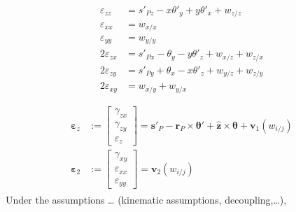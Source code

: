 \documentclass[letterpaper,10pt,english]{jupyterBook}
\begin{document}
\begin{equation*}
\begin{split}\begin{aligned}
    \varepsilon_{zz} & = s'_{Pz} - x \theta'_{y} + y \theta'_{x} + w_{z/z} \\
    \varepsilon_{xx} & = w_{x/x} \\
    \varepsilon_{yy} & = w_{y/y} \\
  2 \varepsilon_{zx} & = s'_{Px} - \theta_y - y \theta'_z + w_{x/z} + w_{z/x} \\
  2 \varepsilon_{zy} & = s'_{Py} + \theta_x - x \theta'_z + w_{y/z} + w_{z/y} \\
  2 \varepsilon_{xy} & = w_{x/y} + w_{y/x} \\
\end{aligned}\end{split}
\end{equation*}\begin{equation*}
\begin{split}\begin{aligned}
  \boldsymbol{\varepsilon}_z & := \begin{bmatrix} \gamma_{zx} \\ \gamma_{zy} \\ \varepsilon_{z} \end{bmatrix}
  = \mathbf{s}'_{P} - \mathbf{r}_P \times \boldsymbol\theta' + \hat{\mathbf{z}} \times \boldsymbol\theta + \mathbf{v}_1(w_{i/j}) \\
  \boldsymbol{\varepsilon}_2 & := \begin{bmatrix} \gamma_{xy} \\ \varepsilon_{xx} \\ \varepsilon_{yy} \end{bmatrix}
  = \mathbf{v}_2(w_{i/j})
\end{aligned}\end{split}
\end{equation*}
\sphinxAtStartPar
{} Under the assumptions … (kinematic assumptions, decoupling,…),
\end{document}
